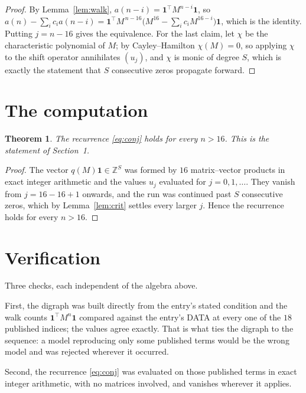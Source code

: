 \documentclass[11pt,a4paper]{article}
\theoremstyle{plain}
\newtheorem{theorem}{Theorem}
\theoremstyle{definition}
\begin{document}
\begin{proof}
By Lemma~\ref{lem:walk}, $a(n-i)=\mathbf{1}^{\!\top}M^{n-i}\mathbf{1}$, so
$a(n)-\sum_i c_i a(n-i)
=\mathbf{1}^{\!\top}M^{\,n-16}\bigl(M^{16}-\sum_i c_i M^{16-i}\bigr)
\mathbf{1}$, which is the identity. Putting $j=n-16$ gives the equivalence. For the
last claim, let $\chi$ be the characteristic polynomial of $M$; by Cayley--Hamilton
$\chi(M)=0$, so applying $\chi$ to the shift operator annihilates $(u_j)$, and $\chi$ is
monic of degree $S$, which is exactly the statement that $S$ consecutive zeros propagate
forward.
\end{proof}

\section{The computation}

\begin{theorem}
The recurrence \eqref{eq:conj} holds for every $n>16$. This is the statement of
Section~1.
\end{theorem}

\begin{proof}
The vector $q(M)\mathbf{1}\in\mathbb{Z}^{S}$ was formed by $16$ matrix--vector
products in exact integer arithmetic and the values $u_j$ evaluated for
$j=0,1,\dots$. They vanish from $j=16-16+1$ onwards, and the run was continued past
$S$ consecutive zeros, which by Lemma~\ref{lem:crit} settles every larger $j$. Hence the
recurrence holds for every $n>16$.
\end{proof}

\section{Verification}

Three checks, each independent of the algebra above.

First, the digraph was built directly from the entry's stated condition and the walk counts
$\mathbf{1}^{\!\top}M^{n}\mathbf{1}$ compared against the entry's DATA at every one of
the $18$ published indices; the values agree exactly. That is what ties the digraph to
the sequence: a model reproducing only some published terms would be the wrong model and
was rejected wherever it occurred.

Second, the recurrence \eqref{eq:conj} was evaluated on those published terms in exact
integer arithmetic, with no matrices involved, and vanishes wherever it applies.
\end{document}
